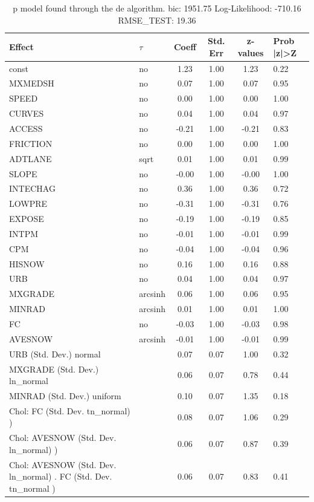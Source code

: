 \begin{table}
	\caption{p model found through the de algorithm. bic: 1951.75 Log-Likelihood: -710.16 RMSE_TEST: 19.36}
	\begin{center}
		\begin{tabular}{|l|l|c|c|c|l|}
			\hline
			Effect & $\tau$ & Coeff & Std. Err & z-values & Prob |z|>Z \\
			\hline
			const & no & 1.23 & 1.00 & 1.23 & 0.22 \\
			\hline
			MXMEDSH & no & 0.07 & 1.00 & 0.07 & 0.95 \\
			\hline
			SPEED & no & 0.00 & 1.00 & 0.00 & 1.00 \\
			\hline
			CURVES & no & 0.04 & 1.00 & 0.04 & 0.97 \\
			\hline
			ACCESS & no & -0.21 & 1.00 & -0.21 & 0.83 \\
			\hline
			FRICTION & no & 0.00 & 1.00 & 0.00 & 1.00 \\
			\hline
			ADTLANE & sqrt & 0.01 & 1.00 & 0.01 & 0.99 \\
			\hline
			SLOPE & no & -0.00 & 1.00 & -0.00 & 1.00 \\
			\hline
			INTECHAG & no & 0.36 & 1.00 & 0.36 & 0.72 \\
			\hline
			LOWPRE & no & -0.31 & 1.00 & -0.31 & 0.76 \\
			\hline
			EXPOSE & no & -0.19 & 1.00 & -0.19 & 0.85 \\
			\hline
			INTPM & no & -0.01 & 1.00 & -0.01 & 0.99 \\
			\hline
			CPM & no & -0.04 & 1.00 & -0.04 & 0.96 \\
			\hline
			HISNOW & no & 0.16 & 1.00 & 0.16 & 0.88 \\
			\hline
			URB & no & 0.04 & 1.00 & 0.04 & 0.97 \\
			\hline
			MXGRADE & arcsinh & 0.06 & 1.00 & 0.06 & 0.95 \\
			\hline
			MINRAD & arcsinh & 0.01 & 1.00 & 0.01 & 1.00 \\
			\hline
			FC & no & -0.03 & 1.00 & -0.03 & 0.98 \\
			\hline
			AVESNOW & arcsinh & -0.01 & 1.00 & -0.01 & 0.99 \\
			\hline
			URB (Std. Dev.) normal &  & 0.07 & 0.07 & 1.00 & 0.32 \\
			\hline
			MXGRADE (Std. Dev.) ln_normal &  & 0.06 & 0.07 & 0.78 & 0.44 \\
			\hline
			MINRAD (Std. Dev.) uniform &  & 0.10 & 0.07 & 1.35 & 0.18 \\
			\hline
			 Chol: FC (Std. Dev. tn_normal) ) &  & 0.08 & 0.07 & 1.06 & 0.29 \\
			\hline
			 Chol: AVESNOW (Std. Dev. ln_normal) ) &  & 0.06 & 0.07 & 0.87 & 0.39 \\
			\hline
			 Chol: AVESNOW (Std. Dev. ln_normal) . FC (Std. Dev.   tn_normal ) &  & 0.06 & 0.07 & 0.83 & 0.41 \\
			\hline
		\end{tabular}
	\end{center}
\end{table}